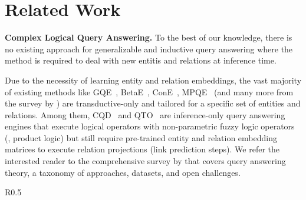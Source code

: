 \section{Related Work}
\label{sec:related_work}

\textbf{Complex Logical Query Answering.}
To the best of our knowledge, there is no existing approach for generalizable and inductive query answering where the method is required to deal with new entitis and relations at inference time.

Due to the necessity of learning entity and relation embeddings, the vast majority of existing methods like GQE~\citep{gqe}, BetaE~\citep{betae}, ConE~\citep{cone}, MPQE~\citep{mpqe} (and many more from the survey by \citet{ren2023ngdb}) are transductive-only and tailored for a specific set of entities and relations.
Among them, CQD~\citep{cqd} and QTO~\citep{qto} are inference-only query answering engines that execute logical operators with non-parametric fuzzy logic operators (\eg, product logic) but still require pre-trained entity and relation embedding matrices to execute relation projections (link prediction steps). 
We refer the interested reader to the comprehensive survey by \citet{ren2023ngdb} that covers query answering theory, a taxonomy of approaches, datasets, and open challenges.

\begin{wraptable}{R}{0.5\textwidth}
\begin{minipage}{0.5\textwidth}
    
\end{minipage}
\end{wraptable}



